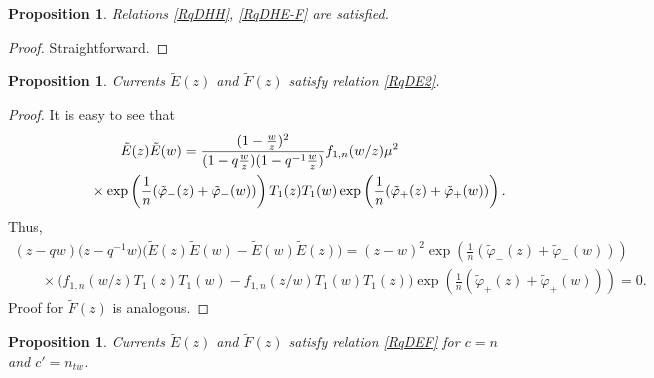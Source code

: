 \documentclass[pdftex]{sigma}
\numberwithin{equation}{section}
\newtheorem{Proposition}[Theorem]{Proposition}
\theoremstyle{definition}
\newcommand{\tE}{\tilde{E}}
\newcommand{\tF}{\tilde{F}}
\newcommand{\tphi}{\tilde{\varphi}}
\begin{document}
\begin{Proposition}
Relations \eqref{RqDHH}, \eqref{RqDHE-F} are satisfied.
\end{Proposition}

\begin{proof}
Straightforward.
\end{proof}

\begin{Proposition}
Currents $\tE(z)$ and $\tF(z)$ satisfy relation \eqref{RqDE2}.
\end{Proposition}

\begin{proof}
It is easy to see that
\begin{gather*}
\tE(z) \tE(w) = \frac{(1-\frac{w}{z})^{2}}{(1-q\frac{w}{z})(1-q^{-1} \frac{w}{z} )} f_{1, n} (w/z) \mu^2 \\
\hphantom{\tE(z) \tE(w) =}{}\times \exp \left( \frac{1}{n} (\tphi_- (z) + \tphi_- (w)) \right) T_1 (z) T_1(w) \exp \left( \frac{1}{n} (\tphi_+ (z) + \tphi_+ (w)) \right).
\end{gather*}
Thus,
\begin{gather*}
(z-qw)\big(z-q^{-1}w\big) \big( \tE(z) \tE(w) - \tE(w) \tE(z) \big)= (z-w)^2 \exp \left( \frac{1}{n} (\tphi_- (z) + \tphi_- (w)) \right) \\
\qquad{}\times \big( f_{1,n}(w/z) T_1(z) T_1(w) - f_{1,n} (z/w) T_1(w) T_1(z)\big) \exp \left( \frac{1}{n} (\tphi_+ (z) + \tphi_+ (w)) \right)=0.
\end{gather*}
Proof for $\tF(z)$ is analogous.
\end{proof}

\begin{Proposition}Currents $\tE(z)$ and $\tF(z)$ satisfy relation \eqref{RqDEF} for $c=n$ and $c'=n_{tw}$.
\end{Proposition}
\end{document}
